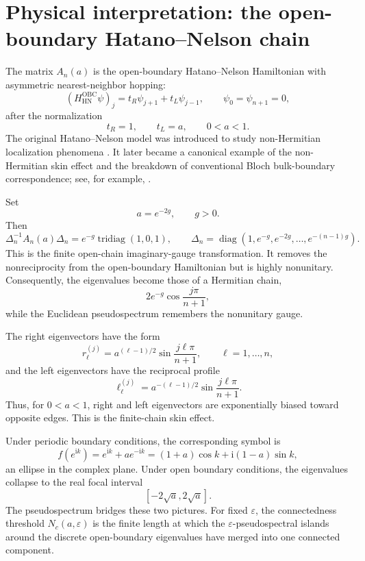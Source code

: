 \documentclass[11pt]{amsart}
\numberwithin{equation}{section}
\DeclareMathOperator{\tridiag}{tridiag}
\DeclareMathOperator{\diag}{diag}
\newcommand{\eps}{\varepsilon}
\newcommand{\ii}{\mathrm i}
\newcommand{\A}{A}
\begin{document}
\section{Physical interpretation: the open-boundary Hatano--Nelson chain}

The matrix \(\A_n(a)\) is the open-boundary Hatano--Nelson Hamiltonian with asymmetric nearest-neighbor hopping:
\[
(H_{\mathrm{HN}}^{\mathrm{OBC}}\psi)_j
=
t_R\psi_{j+1}+t_L\psi_{j-1},
\qquad
\psi_0=\psi_{n+1}=0,
\]
after the normalization
\[
t_R=1,\qquad t_L=a,\qquad 0<a<1.
\]
The original Hatano--Nelson model was introduced to study non-Hermitian localization phenomena \cite{HatanoNelson1996}.  It later became a canonical example of the non-Hermitian skin effect and the breakdown of conventional Bloch bulk-boundary correspondence; see, for example, \cite{YaoWang2018,KunstEdvardssonBudichBergholtz2018,OkumaKawabataShiozakiSato2020,AmmariBarandunCaoDaviesHiltunen2024}.

Set
\[
a=e^{-2g},\qquad g>0.
\]
Then
\[
\Delta_n^{-1}\A_n(a)\Delta_n
=
e^{-g}\tridiag(1,0,1),
\qquad
\Delta_n=\diag(1,e^{-g},e^{-2g},\dots,e^{-(n-1)g}).
\]
This is the finite open-chain imaginary-gauge transformation.  It removes the nonreciprocity from the open-boundary Hamiltonian but is highly nonunitary.  Consequently, the eigenvalues become those of a Hermitian chain,
\[
2e^{-g}\cos\frac{j\pi}{n+1},
\]
while the Euclidean pseudospectrum remembers the nonunitary gauge.

The right eigenvectors have the form
\[
r^{(j)}_\ell
=
a^{(\ell-1)/2}\sin\frac{j\ell\pi}{n+1},
\qquad
\ell=1,\dots,n,
\]
and the left eigenvectors have the reciprocal profile
\[
\ell^{(j)}_\ell
=
a^{-(\ell-1)/2}\sin\frac{j\ell\pi}{n+1}.
\]
Thus, for \(0<a<1\), right and left eigenvectors are exponentially biased toward opposite edges.  This is the finite-chain skin effect.

Under periodic boundary conditions, the corresponding symbol is
\[
f(e^{\ii k})
=
e^{\ii k}+ae^{-\ii k}
=
(1+a)\cos k+\ii(1-a)\sin k,
\]
an ellipse in the complex plane.  Under open boundary conditions, the eigenvalues collapse to the real focal interval
\[
[-2\sqrt a,2\sqrt a].
\]
The pseudospectrum bridges these two pictures.  For fixed \(\eps\), the connectedness threshold \(N_c(a,\eps)\) is the finite length at which the \(\eps\)-pseudospectral islands around the discrete open-boundary eigenvalues have merged into one connected component.
\end{document}
